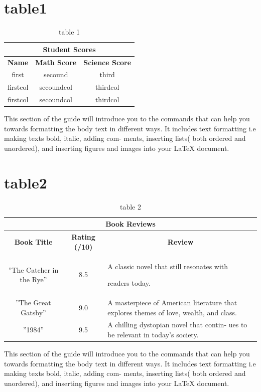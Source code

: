 \documentclass{article}
\begin{document}
\section{table1}
\begin{table}[h!]
    \centering
     \caption{table 1}
    \begin{tabular}{|c |c| c|}
    \hline
  \multicolumn{3}{|c|}{\textbf{Student Scores}}\\
    \hline
 \multicolumn{1}{|c|}{\textbf{Name}} &
\multicolumn{1}{c|}{\textbf{Math Score}}&
\multicolumn{1}{|c|}{\textbf{Science Score}}\\
    \hline
    first & secound & third \\
    \hline
    firstcol & secoundcol & thirdcol \\
    \hline
    firstcol & secoundcol & thirdcol \\
 \hline
    \end{tabular}
\end{table}
This section of the guide will introduce you to the commands that
can help you towards formatting the body text in different ways. It
includes text formatting i.e making texts bold, italic, adding com-
ments, inserting lists( both ordered and unordered), and inserting
figures and images into your LaTeX document.

\newpage
\section{table2}
\begin{table}[h!]
     \caption{table 2}
     \begin{center}
    \begin{tabular}{|c |c|p{6cm}|}
    \hline
  \multicolumn{3}{|c|}{\textbf{Book Reviews}}\\
    \hline
 \multicolumn{1}{|c|}{\textbf{Book Title}} &
\multicolumn{1}{c|}{\textbf{Rating (/10)}}&
\multicolumn{1}{|c|}{\textbf{Review}}\\
    \hline
    ”The Catcher in the Rye” & 8.5 & A classic novel that still resonates with

readers today. \\
    \hline
    ”The Great Gatsby” & 9.0 & A masterpiece of American literature
that explores themes of love, wealth,
and class. \\
    \hline
    ”1984” & 9.5 & A chilling dystopian novel that contin-
ues to be relevant in today’s society. \\
 \hline
    \end{tabular}
    \end{center}
\end{table}
This section of the guide will introduce you to the commands that
can help you towards formatting the body text in different ways. It
includes text formatting i.e making texts bold, italic, adding com-
ments, inserting lists( both ordered and unordered), and inserting
figures and images into your LaTeX document.
\listoffigures
\listoftables
\newpage
\tableofcontents
\end{document}
